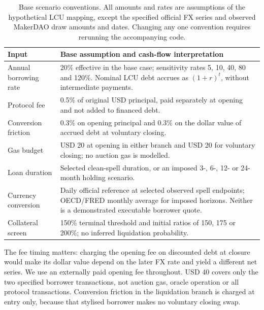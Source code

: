\documentclass[sn-vancouver,Numbered]{sn-jnl}
\begin{document}
\begin{table}[htbp]
\caption{Base scenario conventions. All amounts and rates are assumptions of the hypothetical LCU mapping, except the specified official FX series and observed MakerDAO draw amounts and dates. Changing any one convention requires rerunning the accompanying code.}
\label{tab:assumptions}\centering\small
\begin{tabularx}{.96\textwidth}{p{3.0cm}X}
\toprule
Input & Base assumption and cash-flow interpretation \\
\midrule
Annual borrowing rate & 20\% effective in the base case; sensitivity rates 5, 10, 40, 80 and 120\%. Nominal LCU debt accrues as $(1+r)^t$, without intermediate payments. \\
Protocol fee & 0.5\% of original USD principal, paid separately at opening and not added to financed debt. \\
Conversion friction & 0.3\% on opening principal and 0.3\% on the dollar value of accrued debt at voluntary closing. \\
Gas budget & USD 20 at opening in either branch and USD 20 for voluntary closing; no auction gas is modelled. \\
Loan duration & Selected clean-spell duration, or an imposed 3-, 6-, 12- or 24-month holding scenario. \\
Currency conversion & Daily official reference at selected observed spell endpoints; OECD/FRED monthly average for imposed horizons. Neither is a demonstrated executable borrower quote. \\
Collateral screen & 150\% terminal threshold and initial ratios of 150, 175 or 200\%; no inferred liquidation probability. \\
\bottomrule
\end{tabularx}
\end{table}
The fee timing matters: charging the opening fee on discounted debt at closure would make its dollar value depend on the later FX rate and yield a different net series. We use an externally paid opening fee throughout. USD 40 covers only the two specified borrower transactions, not auction gas, oracle operation or all protocol transactions. Conversion friction in the liquidation branch is charged at entry only, because that stylised borrower makes no voluntary closing swap.
\end{document}
